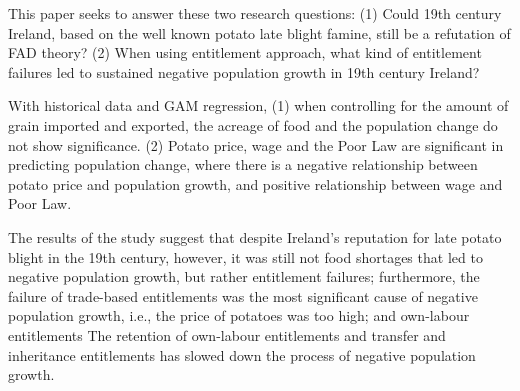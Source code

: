 \documentclass[a4paper,oneside,12pt]{book}
\begin{document}
This paper seeks to answer these two research questions: (1) Could 19th century Ireland, based on the well known potato late blight famine, still be a refutation of FAD theory? (2) When using entitlement approach, what kind of entitlement failures led to sustained negative population growth in 19th century Ireland?

With historical data and GAM regression, (1) when controlling for the amount of grain imported and exported, the acreage of food and the population change do not show significance. (2) Potato price, wage and the Poor Law are significant in predicting population change, where there is a negative relationship between potato price and population growth, and positive relationship between wage and Poor Law.

The results of the study suggest that despite Ireland's reputation for late potato blight in the 19th century, however, it was still not food shortages that led to negative population growth, but rather entitlement failures; furthermore, the failure of trade-based entitlements was the most significant cause of negative population growth, i.e., the price of potatoes was too high; and own-labour entitlements  The retention of own-labour entitlements and transfer and inheritance entitlements has slowed down the process of negative population growth.

\newpage

\newpage \tableofcontents
\newpage \listoffigures
\newpage \listoftables

\newpage

\vspace{2cm}

\mainmatter











\appendix
\renewcommand{\thechapter}{A\arabic{chapter}}
\end{document}
